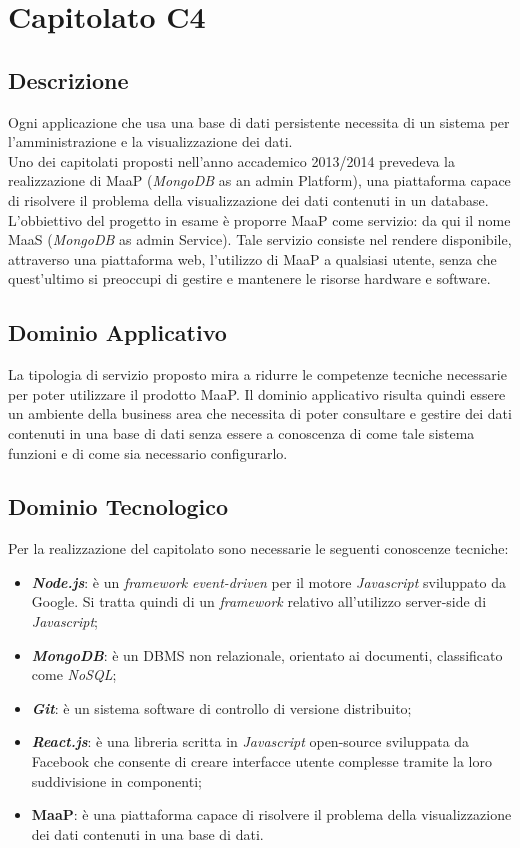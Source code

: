 \newpage
\section{Capitolato C4}
\subsection{Descrizione}
Ogni applicazione che usa una base di dati persistente necessita di un sistema per l'amministrazione e la visualizzazione dei dati.\\ Uno dei capitolati proposti nell'anno accademico 2013/2014 prevedeva la realizzazione di MaaP (\textit{MongoDB} as an admin Platform), una piattaforma capace di risolvere il problema della visualizzazione dei dati contenuti in un database.\\ 
L'obbiettivo del progetto in esame è proporre MaaP come servizio: da qui il nome MaaS (\textit{MongoDB} as admin Service). Tale servizio consiste nel rendere disponibile, attraverso una piattaforma web, l'utilizzo di MaaP a qualsiasi utente, senza che quest'ultimo si preoccupi di gestire e mantenere le risorse hardware e software. 

\subsection{Dominio Applicativo}
La tipologia di servizio proposto mira a ridurre le competenze tecniche necessarie per poter utilizzare il prodotto MaaP. Il dominio applicativo risulta quindi essere un ambiente della business area che necessita di poter consultare e gestire dei dati contenuti in una base di dati senza essere a conoscenza di come tale sistema funzioni e di come sia necessario configurarlo. 

\subsection{Dominio Tecnologico}
Per la realizzazione del capitolato sono necessarie le seguenti conoscenze tecniche:
\begin{itemize}
	\item \textbf{\textit{Node.js}}: è un \textit{framework} \textit{event-driven} per il motore \textit{Javascript} sviluppato da Google. Si tratta quindi di un \textit{framework} relativo all'utilizzo server-side di \textit{Javascript}; 
	\item \textbf{\textit{MongoDB}}: è un DBMS non relazionale, orientato ai documenti, classificato come \textit{NoSQL};
	\item \textbf{\textit{Git}}: è un sistema software di controllo di versione distribuito; 
	\item \textbf{\textit{React.js}}: è una libreria scritta in \textit{Javascript} open-source sviluppata da Facebook che consente di creare interfacce utente complesse tramite la loro suddivisione in componenti; 
	\item \textbf{MaaP}: è una piattaforma capace di risolvere il problema della visualizzazione dei dati contenuti in una base di dati.	
\end{itemize}

